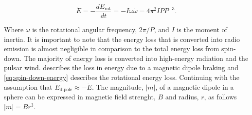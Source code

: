 \begin{equation}
\dot E = - \frac{dE_{\text{rot}}}{dt} = -I \omega \dot \omega= 4\pi^2 I \dot P P^{-3}. 
\label{eq:spin-down-energy}
\end{equation}

Where $\omega$ is the rotational angular frequency, $2\pi/P$, and $I$ is the moment of inertia. It is important to note that the energy loss that is converted into radio emission is almost negligible in comparison to the total energy loss from spin-down. The majority of energy loss is converted into high-energy radiation and the pulsar wind.  describes the loss in energy due to a magnetic dipole braking and \cref{eq:spin-down-energy} describes the rotational energy loss. Continuing with the assumption that $\dot E_{\text{dipole}} \approx -\dot E$. The magnitude, $|m|$, of a magnetic dipole in a sphere can be expressed in magnetic field strenght, $B$ and radius, $r$, as follows $|m|=Br^3$.



